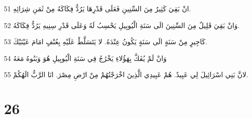 \par 51 انْ بَقِيَ كَثِيرٌ مِنَ السِّنِينِ فَعَلَى قَدْرِهَا يَرُدُّ فِكَاكَهُ مِنْ ثَمَنِ شِرَائِهِ.
\par 52 وَانْ بَقِيَ قَلِيلٌ مِنَ السِّنِينَ الَى سَنَةِ الْيُوبِيلِ يَحْسِبُ لَهُ وَعَلَى قَدْرِ سِنِيهِ يَرُدُّ فِكَاكَهُ.
\par 53 كَاجِيرٍ مِنْ سَنَةٍ الَى سَنَةٍ يَكُونُ عِنْدَهُ. لا يَتَسَلَّطْ عَلَيْهِ بِعُنْفٍ امَامَ عَيْنَيْكَ.
\par 54 وَانْ لَمْ يُفَكَّ بِهَؤُلاءِ يَخْرُجُ فِي سَنَةِ الْيُوبِيلِ هُوَ وَبَنُوهُ مَعَهُ
\par 55 لانَّ بَنِي اسْرَائِيلَ لِي عَبِيدٌ. هُمْ عَبِيدِي الَّذِينَ اخْرَجْتُهُمْ مِنْ ارْضِ مِصْرَ. انَا الرَّبُّ الَهُكُمْ.

\chapter{26}

